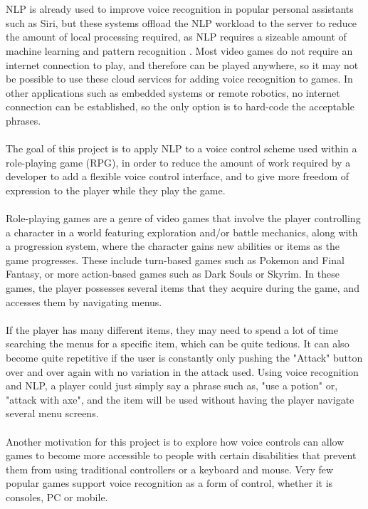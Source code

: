 \documentclass[11pt]{article}
\begin{document}
\\
\\
NLP is already used to improve voice recognition in popular personal assistants such as Siri, but these systems offload the NLP workload to the server to reduce the amount of local processing required, as NLP requires a sizeable amount of machine learning and pattern recognition \cite{RefWorks:21}. Most video games do not require an internet connection to play, and therefore can be played anywhere, so it may not be possible to use these cloud services for adding voice recognition to games. In other applications such as embedded systems or remote robotics, no internet connection can be established, so the only option is to hard-code the acceptable phrases.
\\
\\
The goal of this project is to apply NLP to a voice control scheme used within a role-playing game (RPG), in order to reduce the amount of work required by a developer to add a flexible voice control interface, and to give more freedom of expression to the player while they play the game.
\\
\\
Role-playing games are a genre of video games that involve the player controlling a character in a world featuring exploration and/or battle mechanics, along with a progression system, where the character gains new abilities or items as the game progresses. These include turn-based games such as Pokemon and Final Fantasy, or more action-based games such as Dark Souls or Skyrim. In these games, the player possesses several items that they acquire during the game, and accesses them by navigating menus.
\\
\\
If the player has many different items, they may need to spend a lot of time searching the menus for a specific item, which can be quite tedious. It can also become quite repetitive if the user is constantly only pushing the "Attack" button over and over again with no variation in the attack used. Using voice recognition and NLP, a player could just simply say a phrase such as, "use a potion" or, "attack with axe", and the item will be used without having the player navigate several menu screens.
\\
\\
Another motivation for this project is to explore how voice controls can allow games to become more accessible to people with certain disabilities that prevent them from using traditional controllers or a keyboard and mouse. Very few popular games support voice recognition as a form of control, whether it is consoles, PC or mobile.
\end{document}
